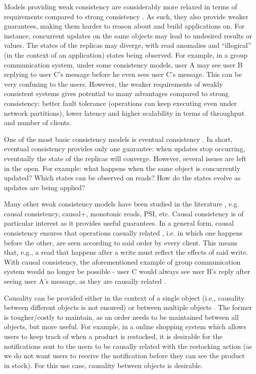 Models providing weak consistency are considerably more relaxed in terms of requirements compared to strong consistency \cite{understandingEC}.
As such, they also provide weaker guarantees, making them harder to reason about and build applications on.
For instance, concurrent updates on the same objects may lead to undesired results or values.
The states of the replicas may diverge, with read anomalies and ``illogical'' (in the context of an application) states being observed.
For example, in a group communication system, under some consistency models, user A may see user B replying to user C's message before he even sees user C's message.
This can be very confusing to the users.
However, the weaker requirements of weakly consistent systems gives potential to many advantages compared to strong consistency: better fault tolerance (operations can keep executing even under network partitions), lower latency and higher scalability in terms of throughput and number of clients.

One of the most basic consistency models is eventual consistency \cite{understandingEC}.
In short, eventual consistency provides only one guarantee: when updates stop occurring, eventually the state of the replicas will converge.
However, several issues are left in the open. For example: what happens when the same object is concurrently updated? Which states can be observed on reads? How do the states evolve as updates are being applied?

Many other weak consistency models have been studied in the literature \cite{understandingEC, session, cops, dynamo, cassandra, walter}, e.g. causal consistency, causal+, monotonic reads, PSI, etc.
Causal consistency is of particular interest as it provides useful guarantees.
In a general form, causal consistency ensures that operations casually related  \cite{lamport2019time}, i.e. in which one happens before the other, are seen according to said order by every client.
This means that, e.g., a read that happens after a write must reflect the effects of said write.
With causal consistency, the aforementioned example of group communication system would no longer be possible - user C would always see user B's reply after seeing user A's message, as they are causally related \cite{lamport2019time, walter}.


Causality can be provided either in the context of a single object (i.e., causality between different objects is not ensured) or between multiple objects \cite{understandingEC}.
The former is tougher/costly to maintain, as an order needs to be maintained between all objects, but more useful.
For example, in a online shopping system which allows users to keep track of when a product is restocked, it is desirable for the notifications sent to the users to be causally related with the restocking action (as we do not want users to receive the notification before they can see the product in stock).
For this use case, causality between objects is desirable.

